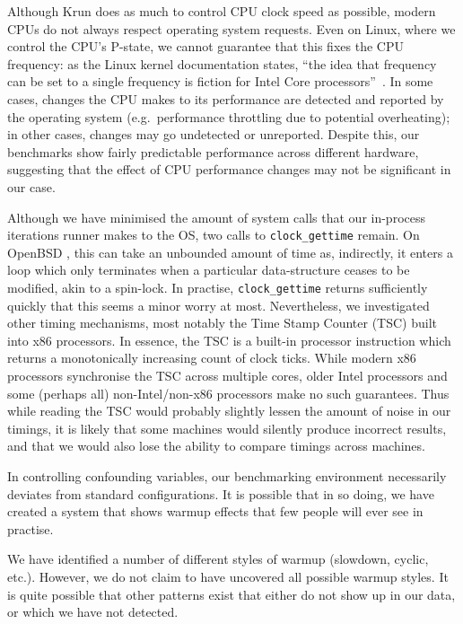 \documentclass[a4paper,UKenglish]{lipics}
\newcommand{\krun}{Krun\xspace}
\begin{document}
Although \krun does as much to control CPU clock speed as possible, modern CPUs
do not always respect operating system requests. Even on Linux, where we control
the CPU's P-state, we cannot guarantee that this fixes the CPU frequency: as
the Linux kernel documentation states, ``the idea that frequency can be set to a single
frequency is fiction for Intel Core processors''~\cite{pstate}. In
some cases, changes the CPU makes to its performance are detected and reported
by the operating system (e.g.~performance throttling due to potential
overheating); in other cases, changes may go undetected or unreported.
Despite this, our benchmarks show fairly predictable performance across
different hardware, suggesting that the effect of CPU performance changes may
not be significant in our case.

Although we have minimised the amount of system calls that our in-process
iterations runner makes to the OS, two calls to \texttt{clock\_gettime} remain.
On OpenBSD , this can take an
unbounded amount of time as, indirectly, it enters a loop which only terminates
when a particular data-structure ceases to be modified, akin to a spin-lock. In
practise, \texttt{clock\_gettime} returns sufficiently quickly that this seems a
minor worry at most. Nevertheless, we investigated other timing mechanisms, most
notably the Time Stamp Counter (TSC) built into x86 processors. In essence,
the TSC is a built-in processor instruction which returns a monotonically
increasing count of clock ticks. While modern x86 processors synchronise the
TSC across multiple cores, older Intel processors and some (perhaps all)
non-Intel/non-x86 processors make no such guarantees. Thus while reading the TSC would
probably slightly lessen the amount of noise in our timings, it is likely that
some machines would silently produce incorrect results, and that we would also
lose the ability to compare timings across machines.

In controlling confounding variables, our benchmarking environment necessarily
deviates from standard configurations. It is possible that in so doing, we have
created a system that shows warmup effects that few people will ever see in
practise.

We have identified a number of different styles of warmup (slowdown, cyclic,
etc.). However, we do not claim to have uncovered all possible warmup styles. It
is quite possible that other patterns exist that either do not show up in our
data, or which we have not detected.
\end{document}
